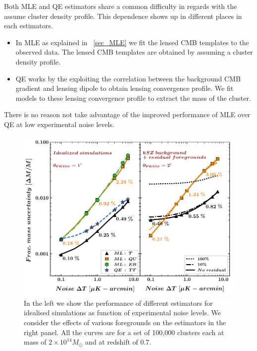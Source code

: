 Both MLE and QE estimators share a common difficulty in regards with the assume cluster density profile.
This dependence shows up in different places in each estimators.
 \begin{itemize}
 \item In MLE as explained in ~\ref{sec_MLE} we fit the lensed CMB templates to the observed data. The lensed CMB templates are obtained by assuming a cluster density profile. 
 \item QE works by the exploiting the correlation between the background CMB gradient and lensing dipole to obtain lensing convergence profile. 
 We fit models to these lensing convergence profile to extract the mass of the cluster.
 
 \end{itemize}
There is no reason not take advantage of the improved performance of MLE over QE at low experimental noise levels. 
 \begin{figure}[t]
\includegraphics[]{figs/fig1-eps-converted-to.pdf}
 \caption{In the left we show the performance of different estimators for idealised simulations as function of experimental noise levels. We consider the effects of various foregrounds on the estimators in the right panel. All the curves are for a set of 100,000 clusters each at mass of $2\times 10^{14} M_{\odot}$ and at redshift of 0.7.}
 \end{figure}
   

